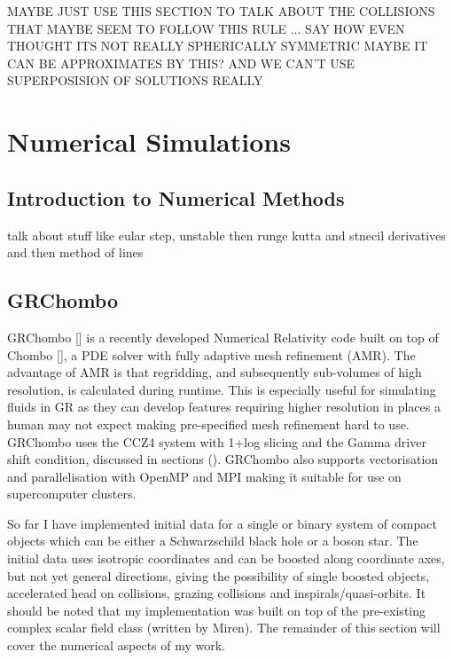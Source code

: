 MAYBE JUST USE THIS SECTION TO TALK ABOUT THE COLLISIONS THAT MAYBE SEEM TO FOLLOW THIS RULE ... SAY HOW EVEN THOUGHT ITS NOT REALLY SPHERICALLY SYMMETRIC MAYBE IT CAN BE APPROXIMATES BY THIS? AND WE CAN'T USE SUPERPOSISION OF SOLUTIONS REALLY 













\section{Numerical Simulations}
\subsection{Introduction to Numerical Methods}

talk about stuff like eular step, unstable then runge kutta and stnecil derivatives and then method of lines



\subsection{GRChombo}
GRChombo [] is a recently developed Numerical Relativity code built on top of Chombo [], a PDE solver with fully adaptive mesh refinement (AMR). The advantage of AMR is that regridding, and subsequently sub-volumes of high resolution, is calculated during runtime. This is especially useful for simulating fluids in GR as they can develop features requiring higher resolution in places a human may not expect making pre-specified mesh refinement hard to use. GRChombo uses the CCZ4 system with 1+log slicing and the Gamma driver shift condition, discussed in sections (). GRChombo also supports vectorisation and parallelisation with OpenMP and MPI making it suitable for use on supercomputer clusters. 

So far I have implemented initial data for a single or binary system of compact objects which can be either a Schwarzschild black hole or a boson star. The initial data uses isotropic coordinates and can be boosted along coordinate axes, but not yet general directions, giving the possibility of single boosted objects, accelerated head on collisions, grazing collisions and inspirals/quasi-orbits. It should be noted that my implementation was built on top of the pre-existing complex scalar field class (written by Miren). The remainder of this section will cover the numerical aspects of my work.

